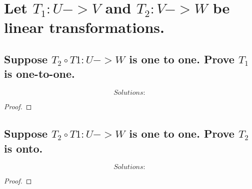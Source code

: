 \documentclass[../main.tex]{subfiles}
\begin{document}
\section[Problem 3]{Let $T_{1}:U->V$ and $T_{2}:V->W$ be linear transformations.}
\subsection{Suppose $T_{2}\circ T{1}:U->W$ is one to one. Prove $T_{1}$ is one-to-one.}
\begin{equation*}
        \boxed{ Solutions:}
\end{equation*}
\begin{proof}
\end{proof}
\subsection{Suppose $T_{2}\circ T{1}:U->W$ is one to one. Prove $T_{2}$ is onto.}
\begin{equation*}
        \boxed{ Solutions:}
\end{equation*}
\begin{proof}
\end{proof}
\end{document}
